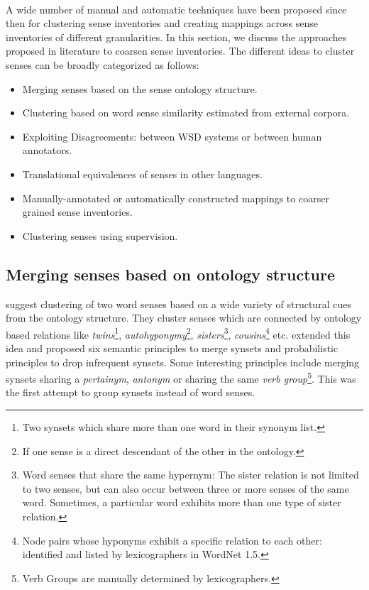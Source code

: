 \paragraph{}
A wide number of manual and automatic techniques have been proposed since then for clustering sense inventories and creating mappings across sense inventories of different granularities. 
In this section, we discuss the approaches proposed in literature to coarsen sense inventories. The different ideas to cluster senses can be broadly categorized as follows: 
\begin{itemize}
\item Merging senses based on the sense ontology structure.
\item Clustering based on word sense similarity estimated from external corpora.
\item Exploiting Disagreements: between WSD systems or between human annotators.
\item Translational equivalences of senses in other languages.
\item Manually-annotated or automatically constructed mappings to coarser grained sense inventories.
\item Clustering senses using supervision.
\end{itemize}

\subsection{Merging senses based on ontology structure}
\citep{peters1998automatic} suggest clustering of two word senses based on a wide variety of structural cues from the ontology structure. They cluster senses which are connected by ontology based relations like  \textit{twins}\footnote{Two synsets which share more than one word in their synonym list.}, \textit{autohyponymy}\footnote{If one sense is a direct descendant of the other in the ontology.}, 
\textit{sisters}\footnote{Word senses that share the same hypernym: The sister relation is not limited to two senses, but can also occur between three or more senses of the same word. Sometimes, a particular word exhibits more than one type of sister relation.}, 
\textit{cousins}\footnote{Node pairs whose hyponyms exhibit a specific relation to each other: identified and listed by lexicographers in WordNet 1.5.} etc.
\citep{Mihalcea01ez.wordnet:principles} extended this idea and proposed six semantic principles to merge synsets and probabilistic principles to drop infrequent synsets.
Some interesting principles include merging synsets sharing a \textit{pertainym}, \textit{antonym} or sharing the same \textit{verb group}\footnote{Verb Groups are manually determined by lexicographers.}.
This was the first attempt to group synsets instead of word senses.

